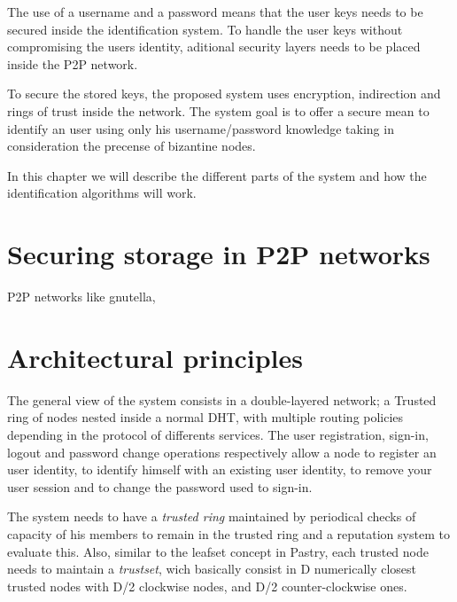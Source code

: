 The use of a username and a password means that the user keys needs to be secured inside the identification system.
To handle the user keys without compromising the users identity, aditional
security layers needs to be placed inside the P2P network.

To secure the stored keys, the proposed system uses encryption, indirection and
rings of trust inside the network. The system goal is to offer a secure mean to
identify an user using only his username/password knowledge taking in
consideration the precense of bizantine nodes.

In this chapter we will describe the different parts of the system and how the
identification algorithms will work.

\section{Securing storage in P2P networks}
P2P networks like gnutella,


\section{Architectural principles}
The general view of the system consists in a double-layered network; a Trusted
ring of nodes nested inside a normal DHT, with multiple routing policies
depending in the protocol of differents services. The user registration,
sign-in, logout and password change operations respectively allow a node to
register an user identity, to identify himself with an existing user identity,
to remove your user session and to change the password used to sign-in.

The system needs to have a \textit{trusted ring} maintained by periodical
checks of capacity of his members to remain in the trusted ring and a
reputation system to evaluate this. Also, similar to the
leafset concept in Pastry, each trusted node needs to maintain a
\textit{trustset}, wich basically consist in D numerically closest trusted
nodes with D/2 clockwise nodes, and D/2 counter-clockwise ones.

